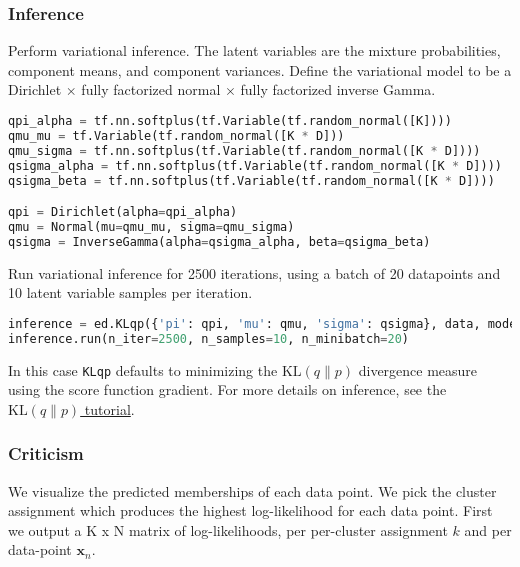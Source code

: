 \subsubsection{Inference}
Perform variational inference.
%
The latent variables are the mixture probabilities,
component means, and component variances.
Define the variational model to be a Dirichlet $\times$ fully factorized normal
$\times$ fully factorized inverse Gamma.
%
\begin{lstlisting}[language=Python]
qpi_alpha = tf.nn.softplus(tf.Variable(tf.random_normal([K])))
qmu_mu = tf.Variable(tf.random_normal([K * D]))
qmu_sigma = tf.nn.softplus(tf.Variable(tf.random_normal([K * D])))
qsigma_alpha = tf.nn.softplus(tf.Variable(tf.random_normal([K * D])))
qsigma_beta = tf.nn.softplus(tf.Variable(tf.random_normal([K * D])))

qpi = Dirichlet(alpha=qpi_alpha)
qmu = Normal(mu=qmu_mu, sigma=qmu_sigma)
qsigma = InverseGamma(alpha=qsigma_alpha, beta=qsigma_beta)
\end{lstlisting}

Run variational inference for 2500 iterations, using a batch
of 20 datapoints and 10 latent variable samples per iteration.
\begin{lstlisting}[language=Python]
inference = ed.KLqp({'pi': qpi, 'mu': qmu, 'sigma': qsigma}, data, model)
inference.run(n_iter=2500, n_samples=10, n_minibatch=20)
\end{lstlisting}
In this case
\texttt{KLqp} defaults to minimizing the
$\text{KL}(q\|p)$ divergence measure using the score function
gradient.
For more details on inference, see the \href{/tutorials/klqp}{$\text{KL}(q\|p)$ tutorial}.


\subsubsection{Criticism}

We visualize the predicted memberships of each data point.
We pick the cluster assignment which produces
the highest log-likelihood for each data point.
First we output a K x N matrix of log-likelihoods, per
per-cluster assignment $k$ and per data-point $\mathbf{x}_n$.

